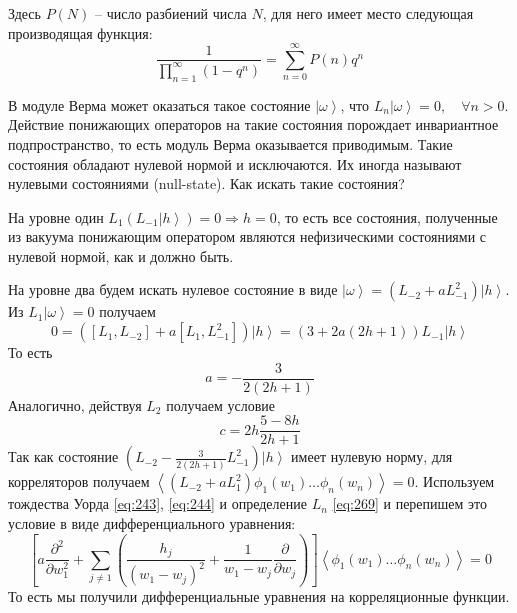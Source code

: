 \documentclass[a4paper,12pt]{article}
\theoremstyle{definition}
\theoremstyle{definition}
\theoremstyle{definition}
\begin{document}
Здесь $P(N)$ -- число разбиений числа $N$, для него имеет место следующая производящая функция:
\begin{equation}
  \label{eq:309}
  \frac{1}{\prod_{n=1}^{\infty} (1-q^{n})} = \sum_{n=0}^{\infty} P(n) q^{n}
\end{equation}

В модуле Верма может оказаться такое состояние $\left|\omega\right>$, что $L_{n}\left|\omega\right>=0, \quad \forall n>0$. Действие понижающих операторов на такие состояния порождает инвариантное подпространство, то есть модуль Верма оказывается приводимым. Такие состояния обладают нулевой нормой и исключаются. Их иногда называют нулевыми состояниями (null-state).  Как искать такие состояния?

На уровне один  $L_{1}\left(L_{-1}\left|h\right>\right)=0\Longrightarrow h=0$, то есть все состояния, полученные из вакуума понижающим оператором являются нефизическими состояниями с нулевой нормой, как и должно быть. 

На уровне два будем искать нулевое состояние в виде $\left|\omega\right>=(L_{-2}+a L_{-1}^{2})\left| h \right> $. Из $L_{1}\left|\omega\right>=0$ получаем
\begin{equation}
  \label{eq:310}
  0=([L_{1},L_{-2}] +a [L_{1},L_{-1}^{2}])\left|h\right> = (3+2a(2h+1))L_{-1}\left|h\right>
\end{equation}
То есть
\begin{equation}
  \label{eq:311}
  a=-\frac{3}{2(2h+1)}
\end{equation}
Аналогично, действуя $L_{2}$ получаем условие
\begin{equation}
  \label{eq:312}
  c=2h\frac{5-8h}{2h+1}
\end{equation}
Так как состояние $(L_{-2}-\frac{3}{2(2h+1)} L_{-1}^{2})\left|h\right>$ имеет нулевую норму, для корреляторов получаем $\left<(L_{-2}+aL_{1}^{2})\phi_{1}(w_{1}) \dots \phi_{n}(w_{n}) \right>=0$. 
Используем тождества Уорда \eqref{eq:243}, \eqref{eq:244} и определение $L_{n}$ \eqref{eq:269} и перепишем это условие в виде дифференциального уравнения:
\begin{equation}
  \label{eq:313}
\left[  a \frac{\partial^{2}}{\partial w_{1}^{2}} +\sum_{j\neq 1} \left(\frac{h_{j}}{(w_{1}-w_{j})^{2}}+\frac{1}{w_{1}-w_{j}} \frac{\partial}{\partial w_{j}}\right)\right] \left< \phi_{1}(w_{1}) \dots \phi_{n}(w_{n}) \right> =0
\end{equation}
То есть мы получили дифференциальные уравнения на корреляционные функции. 
\end{document}
